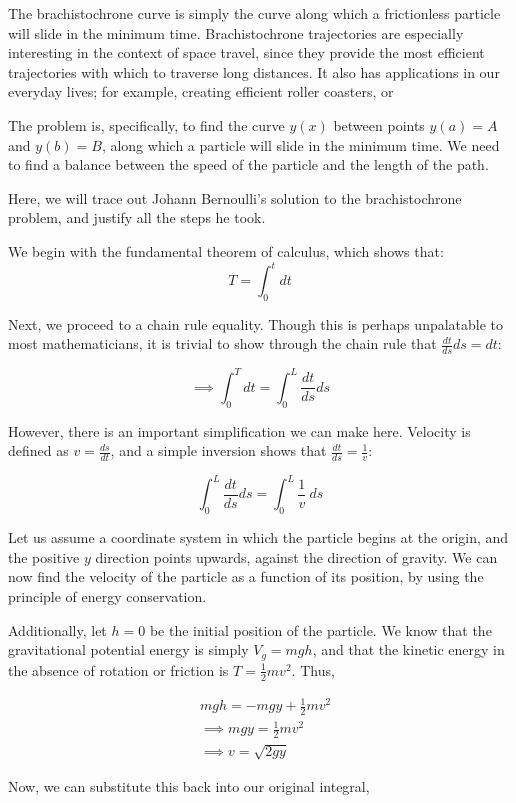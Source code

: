 \documentclass[%
 amsmath,amssymb,
aps,
 fleqn,
 notitlepage,
]{revtex4-2}
\begin{document}
The brachistochrone curve is simply the curve along which a frictionless particle will slide in the minimum time. Brachistochrone trajectories are especially interesting in the context of space travel, since they provide the most efficient trajectories with which to traverse long distances. It also has applications in our everyday lives; for example, creating efficient roller coasters, or

The problem is, specifically, to find the curve $y(x)$ between points $y(a) = A$ and $y(b) = B$, along which a particle will slide in the minimum time. We need to find a balance between the speed of the particle and the length of the path.

Here, we will trace out Johann Bernoulli's solution to the brachistochrone problem, and justify all the steps he took.

We begin with the fundamental theorem of calculus, which shows that:
\[T = \int_0^t dt\]

Next, we proceed to a chain rule equality.  Though this is perhaps unpalatable to most mathematicians, it is trivial to show through the chain rule that $\frac{dt}{ds} ds = dt$:

\[\implies \int_0^T dt = \int_0^L \frac{dt}{ds} ds\]

However, there is an important simplification we can make here.  Velocity is defined as $v = \frac{ds}{dt}$, and a simple inversion shows that $\frac{dt}{ds} = \frac 1v$:

\[\int_0^L \frac{dt}{ds} ds = \int_0^L \frac 1v ~ ds\]

Let us assume a coordinate system in which the particle begins at the origin, and the positive $y$ direction points upwards, against the direction of gravity.  We can now find the velocity of the particle as a function of its position, by using the principle of energy conservation.

Additionally, let $h = 0$ be the initial position of the particle.  We know that the gravitational potential energy is simply $V_g = mgh$, and that the kinetic energy in the absence of rotation or friction is $T = \frac12 mv^2$.  Thus,

\begin{align*}
    &mgh = -mgy + \frac12 mv^2\\
    &\implies mgy = \frac12 mv^2\\
    &\implies v = \sqrt{2gy}
\end{align*}

Now, we can substitute this back into our original integral,
\end{document}
